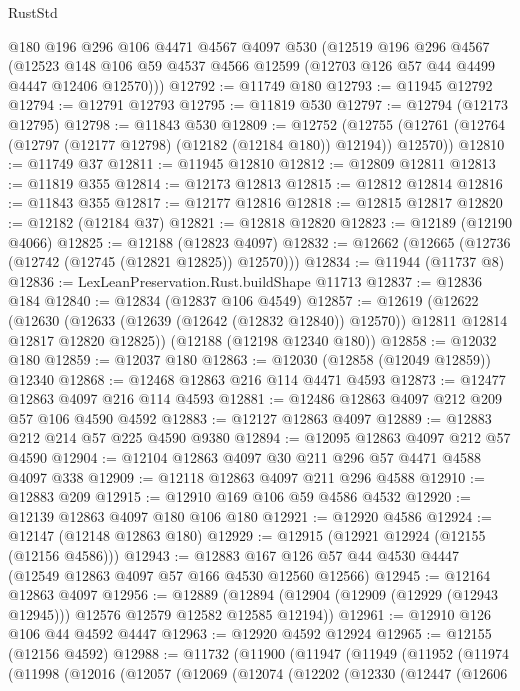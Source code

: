 \begin{lexlean}{RustStd}
\begin{coremodule}
    @180
    @196
    @296
    @106
    @4471
    @4567
    @4097
    @530
    (@12519
      @196
      @296
      @4567
      (@12523 @148 @106 @59 @4537 @4566 @12599 (@12703 @126 @57 @44 @4499 @4447 @12406 @12570)))
@12792 := @11749 @180
@12793 := @11945 @12792
@12794 := @12791 @12793
@12795 := @11819 @530
@12797 := @12794 (@12173 @12795)
@12798 := @11843 @530
@12809 := @12752
    (@12755 (@12761 (@12764 (@12797 (@12177 @12798) (@12182 (@12184 @180)) @12194)) @12570))
@12810 := @11749 @37
@12811 := @11945 @12810
@12812 := @12809 @12811
@12813 := @11819 @355
@12814 := @12173 @12813
@12815 := @12812 @12814
@12816 := @11843 @355
@12817 := @12177 @12816
@12818 := @12815 @12817
@12820 := @12182 (@12184 @37)
@12821 := @12818 @12820
@12823 := @12189 (@12190 @4066)
@12825 := @12188 (@12823 @4097)
@12832 := @12662 (@12665 (@12736 (@12742 (@12745 (@12821 @12825)) @12570)))
@12834 := @11944 (@11737 @8)
@12836 := LexLeanPreservation.Rust.buildShape @11713
@12837 := @12836 @184
@12840 := @12834 (@12837 @106 @4549)
@12857 := @12619
    (@12622
      (@12630 (@12633 (@12639 (@12642 (@12832 @12840)) @12570)) @12811 @12814 @12817 @12820 @12825))
    (@12188 (@12198 @12340 @180))
@12858 := @12032 @180
@12859 := @12037 @180
@12863 := @12030 (@12858 (@12049 @12859)) @12340
@12868 := @12468 @12863 @216 @114 @4471 @4593
@12873 := @12477 @12863 @4097 @216 @114 @4593
@12881 := @12486 @12863 @4097 @212 @209 @57 @106 @4590 @4592
@12883 := @12127 @12863 @4097
@12889 := @12883 @212 @214 @57 @225 @4590 @9380
@12894 := @12095 @12863 @4097 @212 @57 @4590
@12904 := @12104 @12863 @4097 @30 @211 @296 @57 @4471 @4588 @4097 @338
@12909 := @12118 @12863 @4097 @211 @296 @4588
@12910 := @12883 @209
@12915 := @12910 @169 @106 @59 @4586 @4532
@12920 := @12139 @12863 @4097 @180 @106 @180
@12921 := @12920 @4586
@12924 := @12147 (@12148 @12863 @180)
@12929 := @12915 (@12921 @12924 (@12155 (@12156 @4586)))
@12943 := @12883 @167 @126 @57 @44 @4530 @4447 (@12549 @12863 @4097 @57 @166 @4530 @12560 @12566)
@12945 := @12164 @12863 @4097
@12956 := @12889
    (@12894 (@12904 (@12909 (@12929 (@12943 @12945))) @12576 @12579 @12582 @12585 @12194))
@12961 := @12910 @126 @106 @44 @4592 @4447
@12963 := @12920 @4592 @12924
@12965 := @12155 (@12156 @4592)
@12988 := @11732
    (@11900
      (@11947
        (@11949
          (@11952
            (@11974
              (@11998
                (@12016
                  (@12057
                    (@12069
                      (@12074
                        (@12202
                          (@12330
                            (@12447
                              (@12606

\end{coremodule}
\end{lexlean}
